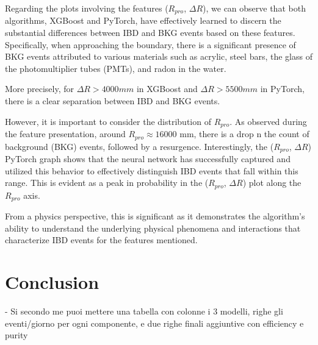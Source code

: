 Regarding the plots involving the features ($R_{pro}$, $\Delta R$), we can observe that both algorithms, XGBoost and PyTorch, have effectively learned to discern the substantial differences between IBD and BKG events based on these features. Specifically, when approaching the boundary, there is a significant presence of BKG events attributed to various materials such as acrylic, steel bars, the glass of the photomultiplier tubes (PMTs), and radon in the water.

More precisely, for $\Delta R > 4000 mm$ in XGBoost and $\Delta R > 5500 mm$ in PyTorch, there is a clear separation between IBD and BKG events.

However, it is important to consider the distribution of $R_{pro}$. As observed during the feature presentation, around $R_{pro} \approx 16000$ mm, there is a drop n the count of background (BKG) events, followed by a resurgence. 
Interestingly, the ($R_{pro}$, $\Delta R$) PyTorch graph shows that the neural network has successfully captured and utilized this behavior to effectively distinguish IBD events that fall within this range. This is evident as a peak in probability in the ($R_{pro}$, $\Delta R$) plot along the $R_{pro}$ axis.

From a physics perspective, this is significant as it demonstrates the algorithm's ability to understand the underlying physical phenomena and interactions that characterize IBD events for the features mentioned.

\section{Conclusion}

- Si secondo me puoi mettere una tabella con colonne i 3 modelli, righe gli eventi/giorno per ogni componente, e due righe finali aggiuntive con efficiency e purity\\


